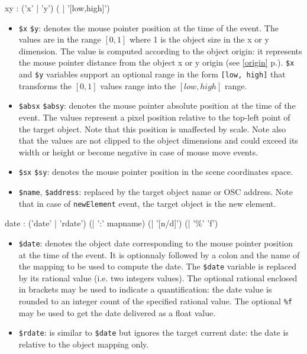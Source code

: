 \documentclass[a4paper,twoside]{report}
\newcommand{\fullref}[1]	{\ref{#1} p.\pageref{#1}}
\newcommand{\OSC}[1]		{\texttt{#1}}
\begin{document}
\begin{rail} 
xy : ('x' | 'y') ( | '[low,high]') 
\end{rail}

\begin{itemize}
\item \OSC{\$x} \OSC{\$y}: denotes the mouse pointer position at the time of the event. The values are in the range $[0,1]$ where 1 is the object size in the x or y dimension. The value is computed according to the object origin: it represents the mouse pointer distance from the object x or y origin (see \fullref{origin}). \OSC{\$x} and \OSC{\$y} variables support an optional range in the form \OSC{[low, high]} that transforms the $[0,1]$  values range into the $[low, high]$ range.

\item \OSC{\$absx} \OSC{\$absy}: denotes the mouse pointer absolute position at the time of the event. The values represent a pixel position relative to the top-left point of the target object. Note that this position is unaffected by scale. 
Note also that the values are not clipped to the object dimensions and could exceed its width or height or become negative in case of mouse move events.

\item \OSC{\$sx} \OSC{\$sy}: denotes the mouse pointer position in the scene coordinates space. 

\item \OSC{\$name}, \OSC{\$address}: replaced by the target object name or OSC address. Note that in case of \OSC{newElement} event, the target object is the new element. 
\end{itemize}

\begin{rail} 
date : ('date' | 'rdate') (| ':'  mapname) (| '[n/d]') (| '\%' 'f')

\end{rail}

\begin{itemize}
\item \OSC{\$date}: denotes the object date corresponding to the mouse pointer position at the time of the event. It is optionnaly followed by a colon and the name of the mapping to be used to compute the date. The \OSC{\$date} variable is replaced by its rational value (i.e. two integers values). The optional rational enclosed in brackets may be used to indicate a quantification: the date value is rounded to an integer count of the specified rational value. The optional \OSC{\%f} may be used to get the date delivered as a float value.
\item \OSC{\$rdate}: is similar to \OSC{\$date} but ignores the target current date: the date is relative to the object mapping only.
\end{itemize}
\end{document}
